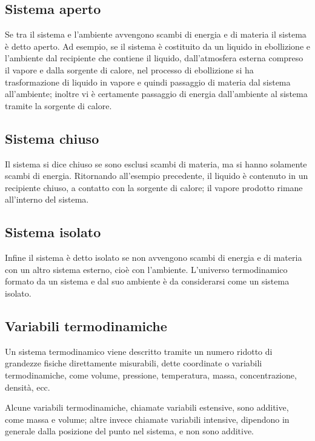 \documentclass[class=book, crop=false, oneside, 12pt]{standalone}
\begin{document}
\subsection{Sistema aperto}

Se tra il sistema e l'ambiente avvengono scambi di energia e di materia il sistema è detto aperto. 
Ad esempio, se il sistema è costituito da un liquido in ebollizione e l'ambiente dal recipiente che contiene il liquido, dall'atmosfera esterna compreso il vapore e dalla sorgente di calore, nel processo di ebollizione si ha trasformazione di liquido in vapore e quindi passaggio di materia dal sistema all'ambiente; 
inoltre vi è certamente passaggio di energia dall'ambiente al sistema tramite la sorgente di calore.

\subsection{Sistema chiuso}

Il sistema si dice chiuso se sono esclusi scambi di materia, ma si hanno solamente scambi di energia. 
Ritornando all'esempio precedente, il liquido è contenuto in un recipiente chiuso, a contatto con la sorgente di calore; il vapore prodotto rimane all'interno del sistema. 

\subsection{Sistema isolato}

Infine il sistema è detto isolato se non avvengono scambi di energia e di materia con un altro sistema esterno, cioè con l'ambiente. 
L'universo termodinamico formato da un sistema e dal suo ambiente è da considerarsi come un sistema isolato. 

\subsection{Variabili termodinamiche}

Un sistema termodinamico viene descritto tramite un numero ridotto di grandezze fisiche direttamente misurabili, dette coordinate o variabili termodinamiche, come volume, pressione, temperatura, massa, concentrazione, densità, ecc. 

Alcune variabili termodinamiche, chiamate variabili estensive, sono additive, come massa e volume; altre invece chiamate variabili intensive, dipendono in generale dalla posizione del punto nel sistema, e non sono additive.
\end{document}
